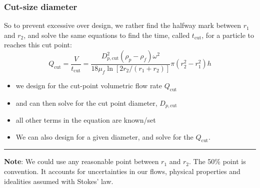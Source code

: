 \begin{frame}\frametitle{Cut-size diameter}
	So to prevent excessive over design, we rather find the halfway mark between $r_1$ and $r_2$, and solve the same equations to find the time, called $t_\text{cut}$, for a particle to reaches this {\color{purple}cut point}:
	\[
		Q_\text{cut} = \frac{V}{t_\text{cut}} = \frac{D_{p,\text{cut}}^2\left(\rho_p - \rho_f\right)\omega^2}{18 \mu_f \ln \left[2r_2/(r_1+r_2)\right]} \pi \left(r_2^2 - r_1^2\right) h
	\]
	\begin{itemize}
		\item	we design for the cut-point volumetric flow rate $Q_\text{cut}$
		\item	and can then solve for the cut point diameter, $D_{p,\text{cut}}$
		\item	all other terms in the equation are known/set
		\item	We can also design for a given diameter, and solve for the $Q_\text{cut}$.
	\end{itemize}
	\vspace{6pt}
	\hrule
	\vspace{6pt}
	{\small \textbf{Note}: We could use any reasonable point between $r_1$ and $r_2$. The 50\% point is convention. It accounts for uncertainties in our flows, physical properties and idealities assumed with Stokes' law.}
\end{frame}

